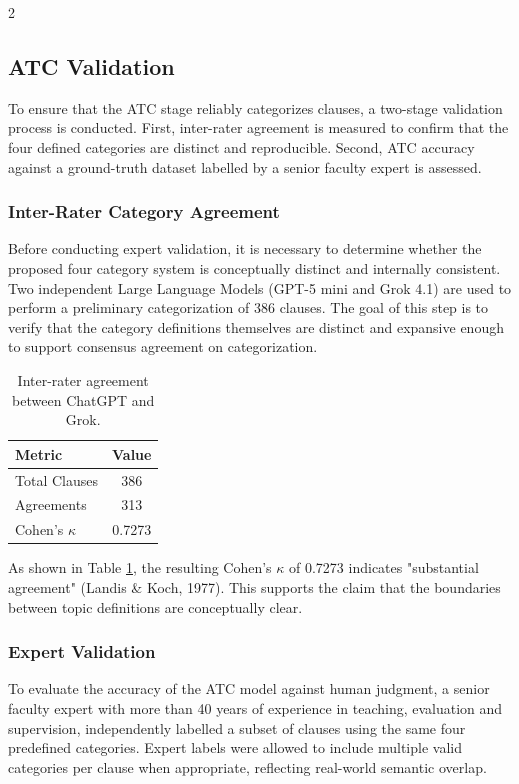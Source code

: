 \documentclass{article}
\begin{document}
\begin{multicols*}{2}
\subsection{ATC Validation}
To ensure that the ATC stage reliably categorizes clauses, a two-stage validation process is conducted. First, inter-rater agreement is measured to confirm that the four defined categories are distinct and reproducible. Second, ATC accuracy against a ground-truth dataset labelled by a senior faculty expert is assessed.
\subsubsection{Inter-Rater Category Agreement}
Before conducting expert validation, it is necessary to determine whether the proposed four category system is conceptually distinct and internally consistent. Two independent Large Language Models (GPT-5 mini and Grok 4.1) are used to perform a preliminary categorization of 386 clauses. The goal of this step is to verify that the category definitions themselves are distinct and expansive enough to support consensus agreement on categorization. 

\begin{table}[H]
\caption{Inter-rater agreement between ChatGPT and Grok.}
\label{tab:kappa-chatgpt-grok}
\centering
\small
\begin{tabular}{l c}
\hline
\textbf{Metric} & \textbf{Value} \\
\hline
Total Clauses & 386 \\
Agreements & 313 \\
Cohen's $\kappa$ & 0.7273 \\
\hline
\end{tabular}

\end{table}

As shown in Table \ref{tab:kappa-chatgpt-grok}, the resulting Cohen’s $\kappa$ of 0.7273 indicates "substantial agreement" (Landis \& Koch, 1977). This supports the claim that the boundaries between topic definitions are conceptually clear.

\subsubsection{Expert Validation}
To evaluate the accuracy of the ATC model against human judgment, a senior faculty expert with more than 40 years of experience in teaching, evaluation and supervision, independently labelled a subset of clauses using the same four predefined categories. Expert labels were allowed to include multiple valid categories per clause when appropriate, reflecting real-world semantic overlap.


\end{multicols*}
\end{document}
